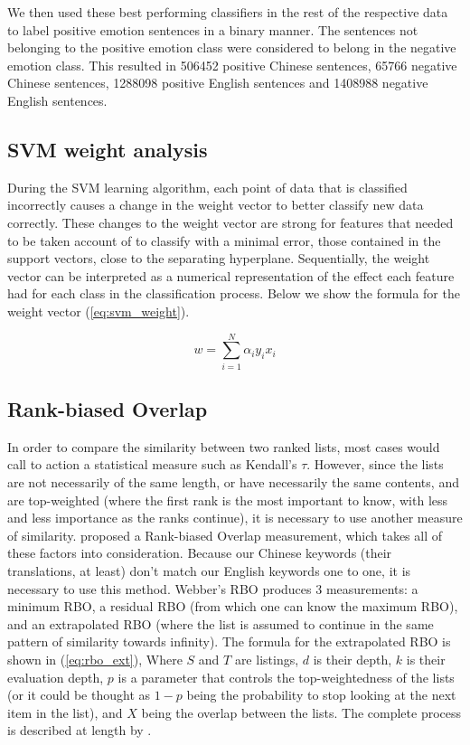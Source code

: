 \documentclass[review]{elsarticle}
\begin{document}
We then used these best performing classifiers in the rest of the respective data to label positive emotion sentences in a binary manner. The sentences not belonging to the positive emotion class were considered to belong in the negative emotion class. This resulted in \num[group-separator={,}]{506452} positive Chinese sentences, \num[group-separator={,}]{65766} negative Chinese sentences, \num[group-separator={,}]{1288098} positive English sentences and \num[group-separator={,}]{1408988} negative English sentences.

\subsection{SVM weight analysis}\label{svmweightsanalysis}

During the SVM learning algorithm, each point of data that is classified incorrectly causes a change in the weight vector to better classify new data correctly. These changes to the weight vector are strong for features that needed to be taken account of to classify with a minimal error, those contained in the support vectors, close to the separating hyperplane. Sequentially, the weight vector can be interpreted as a numerical representation of the effect each feature had for each class in the classification process. Below we show the formula for the weight vector (\ref{eq:svm_weight}).

\begin{equation}\label{eq:svm_weight}
w = \sum_{i=1}^N \alpha_i y_i x_i
\end{equation}

\subsection{Rank-biased Overlap}\label{rbo}

In order to compare the similarity between two ranked lists, most cases would call to action a statistical measure such as Kendall's \(\tau\). However, since the lists are not necessarily of the same length, or have necessarily the same contents, and are top-weighted (where the first rank is the most important to know, with less and less importance as the ranks continue), it is necessary to use another measure of similarity. \cite{webber2010similarity} proposed a Rank-biased Overlap measurement, which takes all of these factors into consideration. Because our Chinese keywords (their translations, at least) don't match our English keywords one to one, it is necessary to use this method. Webber's RBO produces 3 measurements: a minimum RBO, a residual RBO (from which one can know the maximum RBO), and an extrapolated RBO (where the list is assumed to continue in the same pattern of similarity towards infinity). The formula for the extrapolated RBO is shown in (\ref{eq:rbo_ext}), Where \(S\) and \(T\) are listings, \(d\) is their depth, \(k\) is their evaluation depth, \(p\) is a parameter that controls the top-weightedness of the lists (or it could be thought as \(1-p\) being the probability to stop looking at the next item in the list), and \(X\) being the overlap between the lists. The complete process is described at length by \cite{webber2010similarity}.
\end{document}
